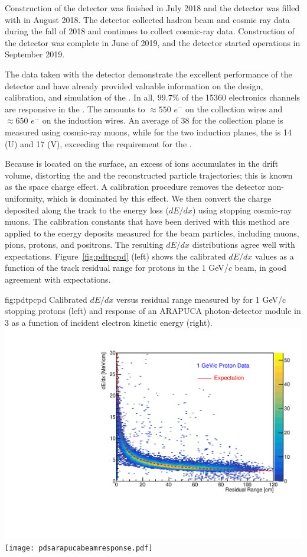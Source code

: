 
Construction of the  detector was finished in July 2018 and the detector was filled with  in August 2018. The detector collected hadron beam and cosmic ray data during the fall of 2018 and continues to collect cosmic-ray data.  Construction of the  detector was complete in June of 2019, and the detector started operations in September 2019.

The data taken with the  detector demonstrate the excellent performance of the detector and have already provided valuable information on the design, calibration, and simulation of the  . In all, $99.7\%$ of the 15360  electronics channels are responsive in the . The  amounts to $\approx 550$ $e^{-}$ on the collection wires and $\approx 650$ $e^{-}$ on the induction wires. An average  of 38 for the collection plane is measured using cosmic-ray muons, while for the two induction planes, the  is 14 (U) and 17 (V), exceeding the requirement %
for the  . 


Because  is located on the surface,  an excess of ions accumulates in the drift volume, %
distorting the \efield and the reconstructed particle trajectories; this is known as the space charge effect. %
A calibration procedure removes the detector non-uniformity, which is dominated by this effect. %
We then convert the charge deposited along the track to the energy loss ($dE/dx$) using stopping cosmic-ray muons. The calibration constants that have been derived with this method are applied to the energy deposits measured for the beam particles, including muons, pions, protons, and positrons.
The resulting $dE/dx$ distributions agree well with expectations.  Figure~\ref{fig:pdtpcpd} (left) shows the calibrated $dE/dx$ values as a function of the track residual range for protons in the 1 GeV/$c$ beam, in good agreement with expectations. 

\begin{dunefigure}
{fig:pdtpcpd}
{Calibrated $dE/dx$ versus residual range measured by  for 1 GeV/c stopping protons (left) and response of an ARAPUCA photon-detector module in 3 as a function of incident electron kinetic energy (right).} \includegraphics[width=0.47\linewidth]{graphics/dedx_rr_data_v5.pdf}
\texttt{[image: pdsarapucabeamresponse.pdf]}
\end{dunefigure}


